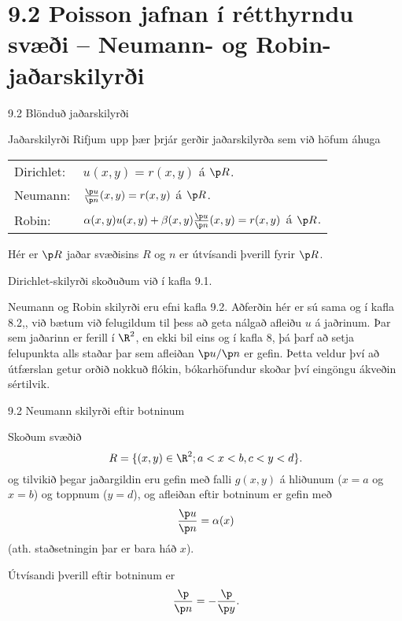 \section*{9.2 Poisson jafnan í rétthyrndu svæði -- Neumann- og Robin-jaðarskilyrði}

\begin{frame}{9.2 Blönduð jaðarskilyrði}
\begin{block}{Jaðarskilyrði}
 Rifjum upp þær þrjár gerðir jaðarskilyrða sem við höfum áhuga
 \begin{center}
 \begin{tabular}{ll}
  Dirichlet: & $u(x,y) = r(x,y)$ á $\p R$.\\
  Neumann:   & $\frac{\p u}{\p n}(x,y) = r(x,y)$ á $\p R$.\\
  Robin:     & $\alpha(x,y)u(x,y) + 
  \beta(x,y)\frac{\p u}{\p n}(x,y) = r(x,y)$ á  $\p R$.\\
 \end{tabular}
 \end{center}
Hér er $\p R$ jaðar svæðisins $R$ og $n$ er útvísandi þverill fyrir $\p R$.
\end{block}

\begin{block}{}
 Dirichlet-skilyrði skoðuðum við í kafla 9.1. \pause
 
 Neumann og Robin skilyrði eru efni kafla 9.2. \pause
 Aðferðin hér er sú sama og í kafla 8.2,, við bætum við felugildum
 til þess að geta nálgað afleiðu $u$ á jaðrinum. \pause
 Þar sem jaðarinn er ferill í $\R^2$, en ekki bil eins og í kafla 8, 
 þá þarf að setja felupunkta alls staðar þar sem afleiðan $\p u/\p n$ er gefin. \pause
 Þetta veldur því að útfærslan getur orðið nokkuð flókin, 
 bókarhöfundur skoðar því eingöngu ákveðin sértilvik. 
\end{block}

\end{frame}


\begin{frame}{9.2 Neumann skilyrði eftir botninum}

 Skoðum svæðið 
  $$
    R = \{ (x,y) \in \R^2 ; a < x < b, c < y < d \}.
  $$ \pause
 og tilvikið þegar jaðargildin eru gefin með falli $g(x,y)$
 á hliðunum ($x=a$ og $x=b$) og toppnum ($y=d$), og 
 afleiðan eftir botninum er gefin með 
 $$
  \frac{\p u}{\p n} = \alpha(x)
 $$
 (ath. staðsetningin þar er bara háð $x$).
 
 Útvísandi þverill eftir botninum er 
 $$
 \frac{\p }{\p n} = -\frac{\p }{\p y}.
 $$
 
\end{frame}


